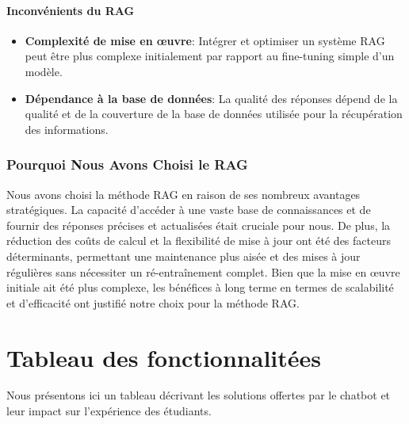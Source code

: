 \documentclass[a4paper, 11pt, openany]{report}
\begin{document}
\paragraph{Inconvénients du RAG}
\begin{itemize}
    \item \textbf{Complexité de mise en œuvre}: Intégrer et optimiser un système RAG peut être plus complexe initialement par rapport au fine-tuning simple d'un modèle.
    \item \textbf{Dépendance à la base de données}: La qualité des réponses dépend de la qualité et de la couverture de la base de données utilisée pour la récupération des informations.
\end{itemize}

\subsubsection{Pourquoi Nous Avons Choisi le RAG}
Nous avons choisi la méthode RAG en raison de ses nombreux avantages stratégiques. La capacité d'accéder à une vaste base de connaissances et de fournir des réponses précises et actualisées était cruciale pour nous. De plus, la réduction des coûts de calcul et la flexibilité de mise à jour ont été des facteurs déterminants, permettant une maintenance plus aisée et des mises à jour régulières sans nécessiter un ré-entraînement complet. Bien que la mise en œuvre initiale ait été plus complexe, les bénéfices à long terme en termes de scalabilité et d'efficacité ont justifié notre choix pour la méthode RAG.


\section{Tableau des fonctionnalitées}
Nous présentons ici un tableau décrivant les solutions offertes par le chatbot et leur impact sur l'expérience des étudiants.
\end{document}
